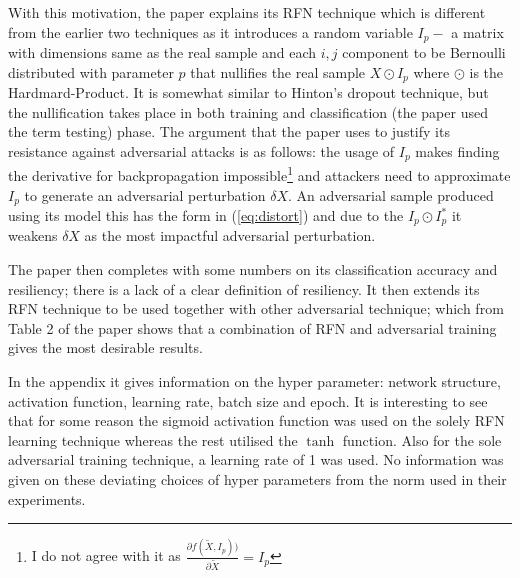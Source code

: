 \documentclass[a4paper,10pt,leqno]{article}
\theoremstyle{definition}
\begin{document}
With this motivation, the paper explains its RFN technique which is different from the earlier two techniques as it introduces a random variable $I_p-$ a matrix with dimensions same as the real sample and each $i,j$ component to be Bernoulli distributed with parameter $p$ that nullifies the real sample $X \odot I_p$ where $\odot$ is the Hardmard-Product. It is somewhat similar to Hinton's dropout technique, but the nullification takes place in both training and classification (the paper used the term testing) phase. The argument that the paper uses to justify its resistance against adversarial attacks is as follows: the usage of  $I_p$ makes finding the derivative for backpropagation impossible\footnote{I do not agree with it as $\frac{\partial f(\tilde{X},I_p))}{\partial \tilde{X}}= I_p$} and attackers need to approximate $I_p$ to generate an adversarial perturbation $\delta X$. An adversarial sample produced using its model this has the form in (\ref{eq:distort}) and due to the $I_p\odot I_p^\ast$ it weakens $\delta X$ as the most impactful adversarial perturbation.

The paper then completes with some numbers on its classification accuracy and resiliency; there is a lack of a clear definition of resiliency. It then extends its RFN technique to be used together with other adversarial technique; which from Table 2 of the paper shows that a combination of RFN and adversarial training gives the most desirable results.

In the appendix it gives information on the hyper parameter: network structure, activation function, learning rate, batch size and epoch. It is interesting to see that for some reason the sigmoid activation function was used on the solely RFN learning technique whereas the rest utilised the $\tanh$ function. Also for the sole adversarial training technique, a learning rate of 1 was used. No information was given on these deviating choices of hyper parameters from the norm used in their experiments.



%
%
%
%
%
\end{document}
